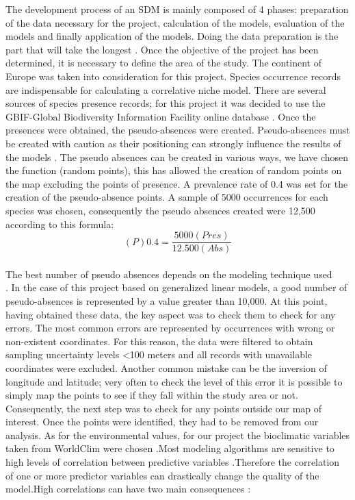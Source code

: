\documentclass[12pt,a4paper]{article}
\begin{document}
The development process of an SDM is mainly composed of 4 phases: preparation of the data necessary for the project, calculation of the models, evaluation of the models and finally application of the models. Doing the data preparation is the part that will take the longest \citep{sil}.
Once the objective of the project has been determined, it is necessary to define the area of the study.
The continent of Europe was taken into consideration for this project.
Species occurrence records are indispensable for calculating a correlative niche model. There are several sources of species presence records; for this project it was decided to use the GBIF-Global Biodiversity Information Facility online database \citep{yes}.
Once the presences were obtained, the pseudo-absences were created.
Pseudo-absences must be created with caution as their positioning can strongly influence the results of the models \citep{mass}.
The pseudo absences can be created in various ways, we have chosen the function (random points), this has allowed the creation of random points on the map excluding the points of presence.
A prevalence rate of 0.4 was set for the creation of the pseudo-absence points.
A sample of 5000 occurrences for each species was chosen, consequently the pseudo absences created were 12,500 according to this formula:\\ \[(P)0.4=\frac{5000(Pres)}{12.500 (Abs)}\] \\
The best number of pseudo absences depends on the modeling technique used\\ \citep{kan} \citep{mass} .
In the case of this project based on generalized linear models, a good number of pseudo-absences is represented by a value greater than 10,000.
At this point, having obtained these data, the key aspect was to check them to check for any errors.
The most common errors are represented by occurrences with wrong or non-existent coordinates.
For this reason, the data were filtered to obtain sampling uncertainty levels <100 meters and all records with unavailable coordinates were excluded.
Another common mistake can be the inversion of longitude and latitude;
very often to check the level of this error it is possible to simply map the points to see if they fall within the study area or not.
Consequently, the next step was to check for any points outside our map of interest.
Once the points were identified, they had to be removed from our analysis.
As for the environmental values, for our project the bioclimatic variables taken from WorldClim were chosen \citep{bcw}.Most modeling algorithms are sensitive to high levels of correlation between predictive variables \citep{dor13}.Therefore the correlation of one or more predictor variables can drastically change the quality of the model.High correlations can have two main consequences \citep{dor13}\citep{demn}:
\end{document}
